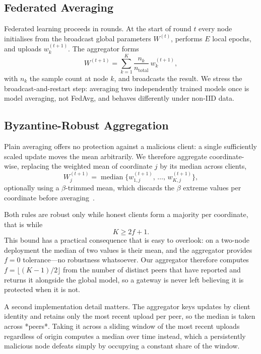 \documentclass[conference]{IEEEtran}
\begin{document}
\subsection{Federated Averaging}
Federated learning proceeds in rounds. At the start of round $t$ every node initialises from the broadcast global parameters $W^{(t)}$, performs $E$ local epochs, and uploads $w_k^{(t+1)}$. The aggregator forms
\begin{equation}
    W^{(t+1)} = \sum_{k=1}^{K}\frac{n_k}{n_{\text{total}}}\, w_k^{(t+1)},
\end{equation}
with $n_k$ the sample count at node $k$, and broadcasts the result. We stress the broadcast-and-restart step: averaging two independently trained models once is model averaging, not FedAvg, and behaves differently under non-IID data.

\subsection{Byzantine-Robust Aggregation}
\label{sec:robust-agg}
Plain averaging offers no protection against a malicious client: a single sufficiently scaled update moves the mean arbitrarily. We therefore aggregate coordinate-wise, replacing the weighted mean of coordinate $j$ by its median across clients,
\begin{equation}
    W^{(t+1)}_j = \operatorname{median}\big\{ w^{(t+1)}_{1,j},\, \dots,\, w^{(t+1)}_{K,j} \big\},
\end{equation}
optionally using a $\beta$-trimmed mean, which discards the $\beta$ extreme values per coordinate before averaging~\cite{yin2018}.

Both rules are robust only while honest clients form a majority per coordinate, that is while
\begin{equation}
    K \ge 2f + 1 .
    \label{eq:byz-bound}
\end{equation}
This bound has a practical consequence that is easy to overlook: on a two-node deployment the median of two values is their mean, and the aggregator provides $f=0$ tolerance---no robustness whatsoever. Our aggregator therefore computes $f = \lfloor (K-1)/2 \rfloor$ from the number of distinct peers that have reported and returns it alongside the global model, so a gateway is never left believing it is protected when it is not.

A second implementation detail matters. The aggregator keys updates by client identity and retains only the most recent upload per peer, so the median is taken across *peers*. Taking it across a sliding window of the most recent uploads regardless of origin computes a median over time instead, which a persistently malicious node defeats simply by occupying a constant share of the window.
\end{document}
